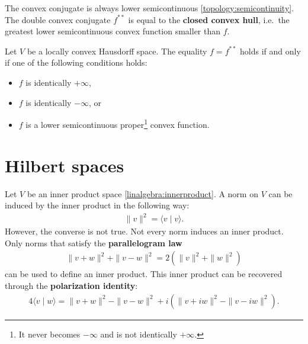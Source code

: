     \begin{property}
        The convex conjugate is always lower semicontinuous \ref{topology:semicontinuity}. The double convex conjugate $f^{**}$ is equal to the \textbf{closed convex hull}, i.e.~the greatest lower semicontinuous convex function smaller than $f$.
    \end{property}

    \begin{theorem}
        Let $V$ be a locally convex Hausdorff space. The equality $f=f^{**}$ holds if and only if one of the following conditions holds:
        \begin{itemize}
            \item $f$ is identically $+\infty$,
            \item $f$ is identically $-\infty$, or
            \item $f$ is a lower semicontinuous proper\footnote{It never becomes $-\infty$ and is not identically $+\infty$.} convex function.
        \end{itemize}
    \end{theorem}

\section{Hilbert spaces}

    \begin{remark}
        Let $V$ be an inner product space \ref{linalgebra:innerproduct}. A norm on $V$ can be induced by the inner product in the following way:
        \begin{gather}
            \label{functional:inner_product_norm}
            \|v\|^2 = \langle v\mid v \rangle.
        \end{gather}
        However, the converse is not true. Not every norm induces an inner product. Only norms that satisfy the \textbf{parallelogram law}
        \begin{gather}
            \label{functional:parallellogram_law}
            \|v+w\|^2 + \|v-w\|^2 = 2(\|v\|^2 + \|w\|^2)
        \end{gather}
        can be used to define an inner product. This inner product can be recovered through the \textbf{polarization identity}:
        \begin{gather}
            \label{functional:polarization_identity}
            4 \langle v\mid w \rangle = \|v+w\|^2 - \|v-w\|^2 + i\left(\|v+iw\|^2 - \|v-iw\|^2\right).
        \end{gather}
    \end{remark}

